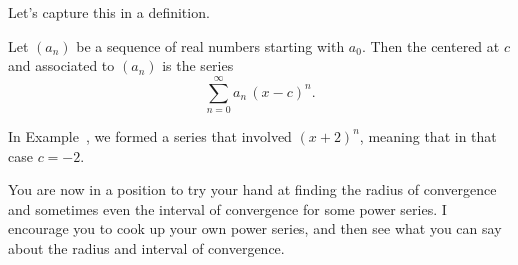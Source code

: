 Let's capture this in a definition.


\begin{definition} 
  \label{defn:power-series-centered-at-c}
  Let $(a_n)$ be a sequence of real numbers starting with $a_0$.  Then
  the  centered at $c$ and associated to $(a_n)$ is the series
  $$
  \sum_{n=0}^\infty a_n \, (x-c)^n.
  $$ 
\end{definition}

In Example~,
we formed a series that involved $(x+2)^n$, meaning that in that case
$c = -2$.

You are now in a position to try your hand at finding the radius of
convergence and sometimes even the interval of convergence for some
power series.  I encourage you to cook up your own power series, and
then see what you can say about the radius and interval of
convergence.


